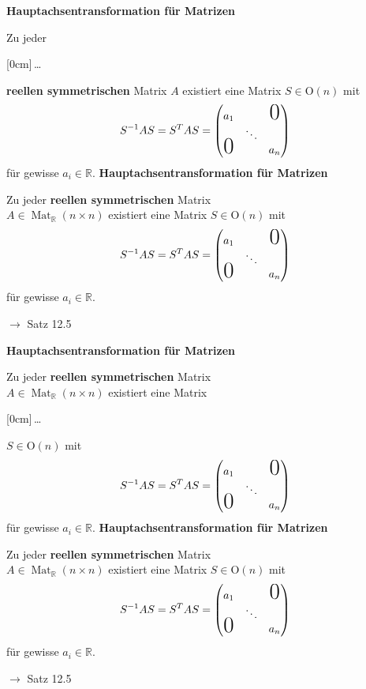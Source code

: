 \documentclass[11pt]{article}
\renewcommand{\cite}[1]{\par\bigskip\hfill{\color{gray}\tiny\(\to\) #1}}
\newcommand{\RR}{\mathbb{R}}
\DeclareMathOperator{\Mat}{Mat}
\newcommand{\hide}[1]{\parbox{0cm}{\raisebox{-7pt}[0cm]{\dots}}\color{white}#1\color{black}}
\let\olddots\dots
\renewcommand{\dots}{\,\olddots\,}
\newenvironment{field}{}{\newpage}
\newif\ifnote
\newenvironment{note}{\notetrue}{\notefalse}
\newcommand{\localtag}{}
\newcommand{\globaltag}{}
\newcommand{\uuid}{}
\newcommand{\tags}[1]{
    \ifnote
        \renewcommand{\localtag}{#1}
    \else
        \renewcommand{\globaltag}{#1}
    \fi
    }
\newcommand{\xplain}[1]{\renewcommand{\uuid}{#1}}
\begin{document}
\begin{note}
    \tags{Satz}
    \xplain{c7c37423-b07c-4459-8002-a0327be7c516}

    \begin{field}
        \textbf{Hauptachsentransformation für Matrizen}

        Zu jeder \hide{\textbf{reellen symmetrischen}} Matrix $A$ existiert eine Matrix $S\in\text{O}(n)$ mit
        \[S^{-1}AS = S^TAS = \begin{pmatrix}
            a_1&&\text{\huge 0}\\
            & \ddots&\\
            \smash{\text{\huge 0}}&& a_n
        \end{pmatrix}\]
        für gewisse $a_i\in\RR$.
    \end{field}
    \begin{field}
        \textbf{Hauptachsentransformation für Matrizen}

        Zu jeder \textbf{reellen symmetrischen} Matrix\\
         $A\in\Mat_{\RR}(n\times n)$ existiert eine Matrix $S\in\text{O}(n)$ mit
        \[S^{-1}AS = S^TAS = \begin{pmatrix}
            a_1&&\text{\huge 0}\\
            & \ddots&\\
            \smash{\text{\huge 0}}&& a_n
        \end{pmatrix}\]
        für gewisse $a_i\in\RR$.
        \cite{Satz 12.5}
    \end{field}

    \begin{field}
        \textbf{Hauptachsentransformation für Matrizen}

        Zu jeder \textbf{reellen symmetrischen} Matrix\\
        $A\in\Mat_{\RR}(n\times n)$ existiert eine Matrix \hide{$S\in\text{O}(n)$} mit
        \[S^{-1}AS = S^TAS = \begin{pmatrix}
            a_1&&\text{\huge 0}\\
            & \ddots&\\
            \smash{\text{\huge 0}}&& a_n
        \end{pmatrix}\]
        für gewisse $a_i\in\RR$.
    \end{field}
    \begin{field}
        \textbf{Hauptachsentransformation für Matrizen}

        Zu jeder \textbf{reellen symmetrischen} Matrix\\
        $A\in\Mat_{\RR}(n\times n)$ existiert eine Matrix $S\in\text{O}(n)$ mit
        \[S^{-1}AS = S^TAS = \begin{pmatrix}
            a_1&&\text{\huge 0}\\
            & \ddots&\\
            \smash{\text{\huge 0}}&& a_n
        \end{pmatrix}\]
        für gewisse $a_i\in\RR$.
        \cite{Satz 12.5}
    \end{field}


\end{note}
\end{document}
